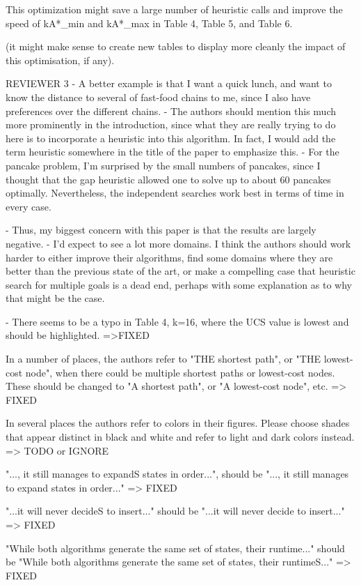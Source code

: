 This optimization might save a large number of heuristic calls and
improve the speed of kA*_min and kA*_max in Table 4, Table 5, and
Table 6.

(it might make sense to create new tables to display more cleanly the
impact of this optimisation, if any).



REVIEWER 3
- A better example is that I want a quick lunch, and want to know the distance to several of fast-food chains to me, since I also have preferences over the different chains.
- The authors should mention this much more prominently in the
introduction, since what they are really trying to do here is to
incorporate a heuristic into this algorithm.  In fact, I would add the term
heuristic somewhere in the title of the paper to emphasize this.
- For the pancake problem, I'm surprised by the small numbers of
pancakes, since I thought that the gap heuristic allowed one to solve up to about 60 pancakes optimally.  Nevertheless, the independent searches work best in terms
of time in every case.

- Thus, my biggest concern with this paper is that the results are
largely negative.  
- I'd expect to see a lot more domains.  I think the authors should work
harder to either improve their algorithms, find some domains where they are
better than the previous state of the art, or make a compelling case that
heuristic search for multiple goals is a dead end, perhaps with some explanation
as to why that might be the case.


- There seems to be a typo in Table 4, k=16, where the UCS value is
lowest and should be highlighted. =>FIXED

In a number of places, the authors refer to "THE shortest
path", or "THE lowest-cost node", when there could be multiple shortest paths or
lowest-cost nodes.  These should be changed to "A shortest path", or
"A lowest-cost node", etc. => FIXED

In several places the authors refer to colors in their figures. 
Please choose shades that appear distinct in black and white and refer to light and
dark colors instead. => TODO or IGNORE

"..., it still manages to expandS states in order...",
should be "..., it still manages to expand states in order..." => FIXED

"...it will never decideS to insert..." should be
"...it will never decide to insert..." => FIXED

"While both algorithms generate the same set of states, their
runtime..." 
should be "While both algorithms generate the same set of states,
their runtimeS..." => FIXED

